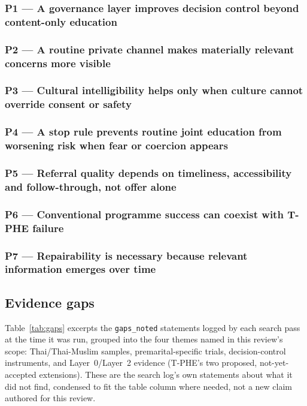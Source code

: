 \documentclass[11pt]{article}
\newcommand{\tphe}{T\mbox{-}PHE}
\begin{document}
\subsubsection*{P1 --- A governance layer improves decision control beyond content-only education}


\subsubsection*{P2 --- A routine private channel makes materially relevant concerns more visible}


\subsubsection*{P3 --- Cultural intelligibility helps only when culture cannot override consent or safety}


\subsubsection*{P4 --- A stop rule prevents routine joint education from worsening risk when fear or coercion appears}


\subsubsection*{P5 --- Referral quality depends on timeliness, accessibility and follow-through, not offer alone}


\subsubsection*{P6 --- Conventional programme success can coexist with \tphe{} failure}


\subsubsection*{P7 --- Repairability is necessary because relevant information emerges over time}


\subsection{Evidence gaps}
Table~\ref{tab:gaps} excerpts the \texttt{gaps\_noted} statements logged by each search pass at the
time it was run, grouped into the four themes named in this review's scope: Thai/Thai-Muslim
samples, premarital-specific trials, decision-control instruments, and Layer~0/Layer~2 evidence
(\tphe{}'s two proposed, not-yet-accepted extensions). These are the search log's own statements
about what it did not find, condensed to fit the table column where needed, not a new claim
authored for this review.
\end{document}
